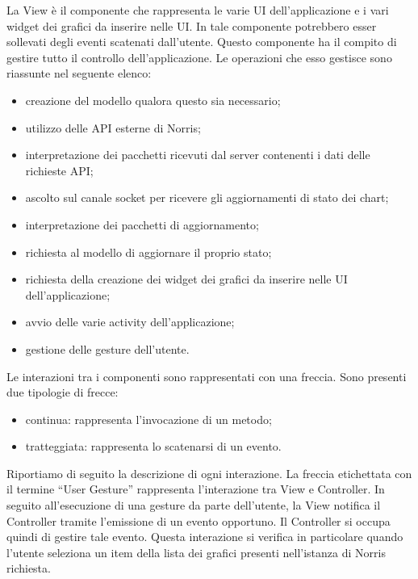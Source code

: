         La View è il componente che rappresenta le varie UI dell'applicazione e i vari widget dei grafici da inserire nelle UI. In tale componente potrebbero esser sollevati degli eventi scatenati dall'utente.
        Questo componente ha il compito di gestire tutto il controllo dell'applicazione. Le operazioni che esso gestisce sono riassunte nel seguente elenco:
        	\begin{itemize}
        		\item creazione del modello qualora questo sia necessario;
        		\item utilizzo delle API esterne di Norris;
        		\item interpretazione dei pacchetti ricevuti dal server contenenti i dati delle richieste API;
        		\item ascolto sul canale socket per ricevere gli aggiornamenti di stato dei chart;
        		\item interpretazione dei pacchetti di aggiornamento;
        		\item richiesta al modello di aggiornare il proprio stato;
        		\item richiesta della creazione dei widget dei grafici da inserire nelle UI dell'applicazione;
        		\item avvio delle varie activity dell'applicazione;
        		\item gestione delle gesture dell'utente.
        \end{itemize}
    	Le interazioni tra i componenti sono rappresentati con una freccia. Sono presenti due tipologie di frecce:
    	\begin{itemize}
    			\item{continua: } rappresenta l'invocazione di un metodo;
    			\item{tratteggiata: } rappresenta lo scatenarsi di un evento.
    		\end{itemize}
    	Riportiamo di seguito la descrizione di ogni interazione.
	    La freccia etichettata con il termine “User Gesture” rappresenta l'interazione tra View e Controller. In seguito all'esecuzione di una gesture da parte dell'utente, la View notifica il Controller tramite l'emissione di un evento opportuno. Il Controller si occupa quindi di gestire tale evento. Questa interazione si verifica in particolare quando l'utente seleziona un item della lista dei grafici presenti nell'istanza di Norris richiesta.
